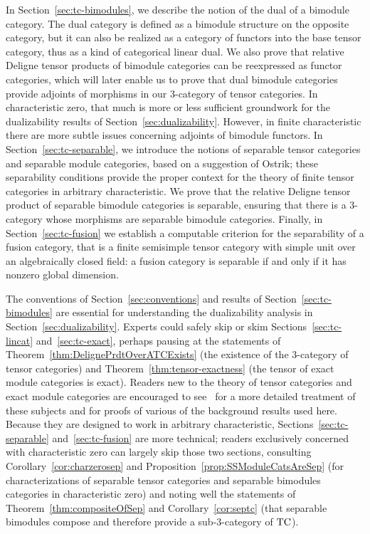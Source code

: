 \documentclass{amsart}
\begin{document}
In Section~\ref{sec:tc-bimodules}, we describe the notion of the dual of a bimodule category.  The dual category is defined as a bimodule structure on the opposite category, but it can also be realized as a category of functors into the base tensor category, thus as a kind of categorical linear dual.  We also prove that relative Deligne tensor products of bimodule categories can be reexpressed as functor categories, which will later enable us to prove that dual bimodule categories provide adjoints of morphisms in our 3-category of tensor categories.  In characteristic zero, that much is more or less sufficient groundwork for the dualizability results of Section~\ref{sec:dualizability}.  However, in finite characteristic there are more subtle issues concerning adjoints of bimodule functors.  In Section~\ref{sec:tc-separable}, we introduce the notions of separable tensor categories and separable module categories, based on a suggestion of Ostrik; these separability conditions provide the proper context for the theory of finite tensor categories in arbitrary characteristic.  We prove that the relative Deligne tensor product of separable bimodule categories is separable, ensuring that there is a 3-category whose morphisms are separable bimodule categories.  Finally, in Section~\ref{sec:tc-fusion} we establish a computable criterion for the separability of a fusion category, that is a finite semisimple tensor category with simple unit over an algebraically closed field: a fusion category is separable if and only if it has nonzero global dimension.

The conventions of Section~\ref{sec:conventions} and results of Section~\ref{sec:tc-bimodules} are essential for understanding the dualizability analysis in Section~\ref{sec:dualizability}.  Experts could safely skip or skim Sections~\ref{sec:tc-lincat} and~\ref{sec:tc-exact}, perhaps pausing at the statements of Theorem~\ref{thm:DelignePrdtOverATCExists} (the existence of the 3-category of tensor categories) and Theorem~\ref{thm:tensor-exactness} (the tensor of exact module categories is exact).  Readers new to the theory of tensor categories and exact module categories are encouraged to see~\cite{BTP} for a more detailed treatment of these subjects and for proofs of various of the background results used here.  Because they are designed to work in arbitrary characteristic, Sections~\ref{sec:tc-separable} and~\ref{sec:tc-fusion} are more technical; readers exclusively concerned with characteristic zero can largely skip those two sections, consulting Corollary~\ref{cor:charzerosep} and Proposition~\ref{prop:SSModuleCatsAreSep} (for characterizations of separable tensor categories and separable bimodules categories in characteristic zero) and noting well the statements of Theorem~\ref{thm:compositeOfSep} and Corollary~\ref{cor:septc} (that separable bimodules compose and therefore provide a sub-3-category of $\mathrm{TC}$).
\end{document}
